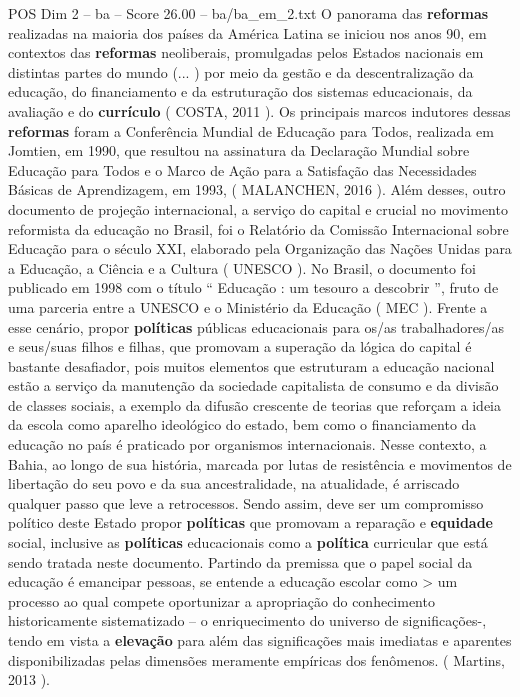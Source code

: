 \begin{textsample}{POS Dim 2 – ba – Score 26.00 – ba/ba\_em\_2.txt}
O panorama das \textbf{reformas} realizadas na maioria dos países da América Latina se iniciou nos anos 90, em contextos das \textbf{reformas} neoliberais, promulgadas pelos Estados nacionais em distintas partes do mundo (... ) por meio da gestão e da descentralização da educação, do financiamento e da estruturação dos sistemas educacionais, da avaliação e do \textbf{currículo} ( COSTA, 2011 ).
Os principais marcos indutores dessas \textbf{reformas} foram a Conferência Mundial de Educação para Todos, realizada em Jomtien, em 1990, que resultou na assinatura da Declaração Mundial sobre Educação para Todos e o Marco de Ação para a Satisfação das Necessidades Básicas de Aprendizagem, em 1993, ( MALANCHEN, 2016 ).
Além desses, outro documento de projeção internacional, a serviço do capital e crucial no movimento reformista da educação no Brasil, foi o Relatório da Comissão Internacional sobre Educação para o século XXI, elaborado pela Organização das Nações Unidas para a Educação, a Ciência e a Cultura ( UNESCO ).
No Brasil, o documento foi publicado em 1998 com o título “ Educação : um tesouro a descobrir ”, fruto de uma parceria entre a UNESCO e o Ministério da Educação ( MEC ).
Frente a esse cenário, propor \textbf{políticas} públicas educacionais para os/as trabalhadores/as e seus/suas filhos e filhas, que promovam a superação da lógica do capital é bastante desafiador, pois muitos elementos que estruturam a educação nacional estão a serviço da manutenção da sociedade capitalista de consumo e da divisão de classes sociais, a exemplo da difusão crescente de teorias que reforçam a ideia da escola como aparelho ideológico do estado, bem como o financiamento da educação no país é praticado por organismos internacionais.
Nesse contexto, a Bahia, ao longo de sua história, marcada por lutas de resistência e movimentos de libertação do seu povo e da sua ancestralidade, na atualidade, é arriscado qualquer passo que leve a retrocessos.
Sendo assim, deve ser um compromisso político deste Estado propor \textbf{políticas} que promovam a reparação e \textbf{equidade} social, inclusive as \textbf{políticas} educacionais como a \textbf{política} curricular que está sendo tratada neste documento.
Partindo da premissa que o papel social da educação é emancipar pessoas, se entende a educação escolar como > um processo ao qual compete oportunizar a apropriação do conhecimento historicamente sistematizado – o enriquecimento do universo de significações-, tendo em vista a \textbf{elevação} para além das significações mais imediatas e aparentes disponibilizadas pelas dimensões meramente empíricas dos fenômenos. ( Martins, 2013 ).

\end{textsample}
